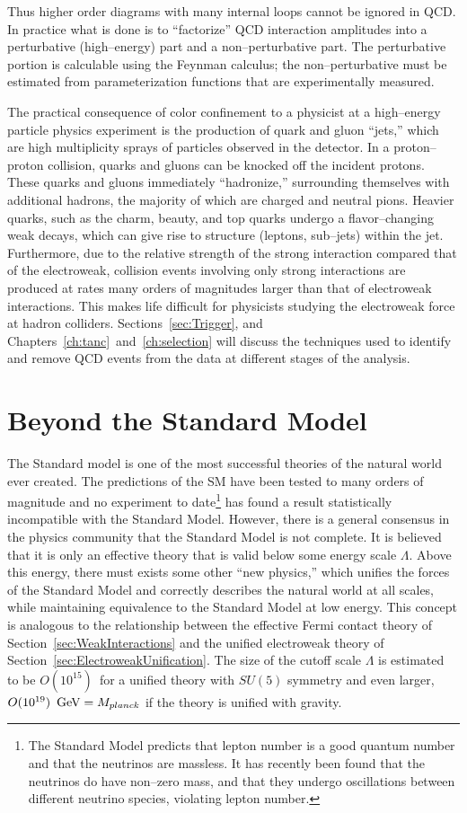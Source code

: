 Thus higher order diagrams with many internal loops cannot be ignored in
QCD\@.  In practice what is done is to ``factorize'' QCD interaction
amplitudes into a perturbative (high--energy) part and a non--perturbative
part.  The perturbative portion is calculable using the Feynman calculus; the
non--perturbative must be estimated from parameterization functions that are
experimentally measured.

The practical consequence of color confinement to a physicist at a high--energy
particle physics experiment is the production of quark and gluon ``jets,'' which
are high multiplicity sprays of particles observed in the detector.  In a
proton--proton collision, quarks and gluons can be knocked off the incident
protons.  These quarks and gluons immediately ``hadronize,'' surrounding
themselves with additional hadrons, the majority of which are charged and
neutral pions.  Heavier quarks, such as the charm, beauty, and top quarks
undergo a flavor--changing weak decays, which can give rise to structure
(leptons, sub--jets) within the jet.  Furthermore, due to the relative strength
of the strong interaction compared that of the electroweak, collision events
involving only strong interactions are produced at rates many orders of
magnitudes larger than that of electroweak interactions.  This makes life
difficult for physicists studying the electroweak force at hadron colliders.
Sections~\ref{sec:Trigger}, and Chapters~\ref{ch:tanc}~and~\ref{ch:selection}
will discuss the techniques used to identify and remove QCD events from the data
at different stages of the analysis.

\section{Beyond the Standard Model}
\label{sec:BSM} The Standard model is one of the most successful theories of the
natural world ever created.  The predictions of the SM have been tested to many
orders of magnitude and no experiment to date\footnote{The Standard Model
predicts that lepton number is a good quantum number and that the neutrinos are
massless.  It has recently been found that the neutrinos do have non--zero mass,
and that they undergo oscillations between different neutrino species, violating
lepton number.} has found a result statistically incompatible with the Standard
Model.  However, there is a general consensus in the physics community that the
Standard Model is not complete. It is believed that it is only an effective theory
that is valid below some energy scale $\Lambda$.  Above this energy, there must exists
some other ``new physics,'' which unifies the forces of the Standard Model and
correctly describes the natural world at all scales, while maintaining
equivalence to the Standard Model at low energy.  This concept is analogous to
the relationship between the effective Fermi contact theory of
Section~\ref{sec:WeakInteractions} and the unified electroweak theory of
Section~\ref{sec:ElectroweakUnification}. The size of the cutoff scale $\Lambda$
is estimated~\cite{Morii:SMandBSM} to be $O(10^{15})$~\GeV for a unified theory
with $SU(5)$ symmetry and even larger, $O(10^{19})~\,\text{Ge\hspace{-.08em}V} = M_{planck}$ if the
theory is unified with gravity.  

